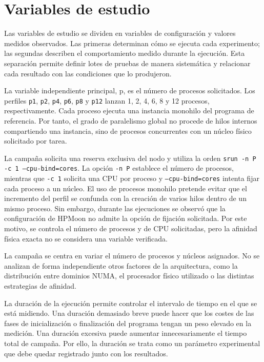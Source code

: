 \section{Variables de estudio}
\label{sec:variables-diseno-experimental}

Las variables de estudio se dividen en variables de configuración y valores medidos observados. Las primeras determinan cómo se ejecuta cada experimento; las segundas describen el comportamiento medido durante la ejecución. Esta separación permite definir lotes de pruebas de manera sistemática y relacionar cada resultado con las condiciones que lo produjeron.

La variable independiente principal, p,  es el número de procesos solicitados. Los perfiles \texttt{p1}, \texttt{p2}, \texttt{p4}, \texttt{p6}, \texttt{p8} y \texttt{p12} lanzan 1, 2, 4, 6, 8 y 12 procesos, respectivamente. Cada proceso ejecuta una instancia monohilo del programa de referencia. Por tanto, el grado de paralelismo global no procede de hilos internos compartiendo una instancia, sino de procesos concurrentes con un núcleo físico solicitado por tarea.

La campaña solicita una reserva exclusiva del nodo y utiliza la orden \texttt{srun -n P -c 1 --cpu-bind=cores}. La opción \texttt{-n P} establece el número de procesos, mientras que \texttt{-c 1} solicita una CPU por proceso y \texttt{--cpu-bind=cores} intenta fijar cada proceso a un núcleo. El uso de procesos monohilo pretende evitar que el incremento del perfil se confunda con la creación de varios hilos dentro de un mismo proceso. Sin embargo, durante las ejecuciones se observó que la configuración de HPMoon no admite la opción de fijación solicitada. Por este motivo, se controla el número de procesos y de CPU solicitadas, pero la afinidad física exacta no se considera una variable verificada.

La campaña se centra en variar el número de procesos y núcleos asignados. No se analizan de forma independiente otros factores de la arquitectura, como la distribución entre dominios NUMA, el procesador físico utilizado o las distintas estrategias de afinidad.

La duración de la ejecución permite controlar el intervalo de tiempo en el que se está midiendo. Una duración demasiado breve puede hacer que los costes de las fases de inicialización o finalización del programa tengan un peso elevado en la medición. Una duración excesiva puede aumentar innecesariamente el tiempo total de campaña. Por ello, la duración se trata como un parámetro experimental que debe quedar registrado junto con los resultados.

